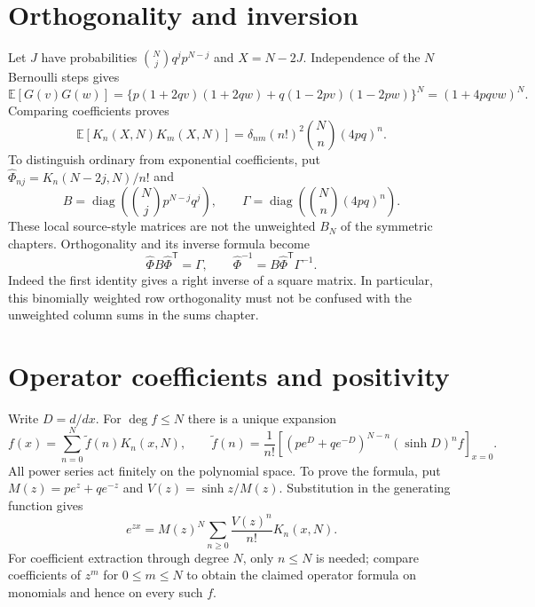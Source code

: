 \section{Orthogonality and inversion}
Let $J$ have probabilities $\binom Nj q^jp^{N-j}$ and $X=N-2J$.
Independence of the $N$ Bernoulli steps gives
\begin{equation*}
\mathbb E[G(v)G(w)]
=\{p(1+2qv)(1+2qw)+q(1-2pv)(1-2pw)\}^N
=(1+4pqvw)^N.
\end{equation*}
Comparing coefficients proves
\begin{equation}
\mathbb E[K_n(X,N)K_m(X,N)]
=\delta_{nm}(n!)^2\binom Nn(4pq)^n.
\end{equation}
To distinguish ordinary from exponential coefficients, put
$\widehat\Phi_{nj}=K_n(N-2j,N)/n!$ and
\begin{equation*}
B=\operatorname{diag}\!\left(\binom Nj p^{N-j}q^j\right),\qquad
\Gamma=\operatorname{diag}\!\left(\binom Nn(4pq)^n\right).
\end{equation*}
These local source-style matrices are not the unweighted $B_N$ of the
symmetric chapters. Orthogonality and its inverse formula become
\begin{equation*}
\widehat\Phi B\widehat\Phi^{\mathsf T}=\Gamma,
\qquad
\widehat\Phi^{-1}=B\widehat\Phi^{\mathsf T}\Gamma^{-1}.
\end{equation*}
Indeed the first identity gives a right inverse of a square matrix.
In particular, this binomially weighted row orthogonality must not be
confused with the unweighted column sums in the sums chapter.

\section{Operator coefficients and positivity}
Write $D=d/dx$. For $\deg f\le N$ there is a unique expansion
\begin{equation*}
f(x)=\sum_{n=0}^N\widetilde f(n)K_n(x,N),\qquad
\widetilde f(n)=\frac1{n!}
\left[(pe^D+qe^{-D})^{N-n}(\sinh D)^nf\right]_{x=0}.
\end{equation*}
All power series act finitely on the polynomial space. To prove the formula,
put $M(z)=pe^z+qe^{-z}$ and $V(z)=\sinh z/M(z)$. Substitution in the generating
function gives
\begin{equation*}
e^{zx}=M(z)^N\sum_{n\ge0}\frac{V(z)^n}{n!}K_n(x,N).
\end{equation*}
For coefficient extraction through degree $N$, only $n\le N$ is needed;
compare coefficients of $z^m$ for $0\le m\le N$ to obtain the claimed
operator formula on monomials and hence on every such $f$.

